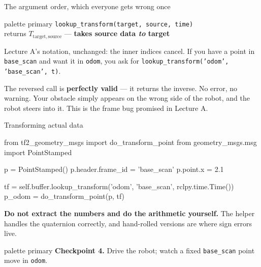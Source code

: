 \documentclass[aspectratio=169]{beamer}
\begin{document}
\begin{frame}{The argument order, which everyone gets wrong once}
  \begin{beamercolorbox}[sep=8pt,center,rounded=true]{palette primary}
    \small \texttt{lookup\_transform(target, source, time)}\\[0.3em]
    returns $T_{\text{target},\,\text{source}}$ --- \textbf{takes source data \emph{to} target}
  \end{beamercolorbox}

  \vspace{0.8em}
  \small
  Lecture A's notation, unchanged: the inner indices cancel. If you have a point in
  \texttt{base\_scan} and want it in \texttt{odom}, you ask for
  \texttt{lookup\_transform('odom', 'base\_scan', t)}.

  \vspace{0.8em}
  \begin{underhood}
    \footnotesize
    The reversed call is \textbf{perfectly valid} --- it returns the inverse. No error, no
    warning. Your obstacle simply appears on the wrong side of the robot, and the robot
    steers into it. This is the frame bug promised in Lecture A.
  \end{underhood}
\end{frame}

\begin{frame}[fragile]{Transforming actual data}
  \begin{pycodes}
from tf2_geometry_msgs import do_transform_point
from geometry_msgs.msg import PointStamped

p = PointStamped()
p.header.frame_id = 'base_scan'
p.point.x = 2.1

tf = self.buffer.lookup_transform('odom', 'base_scan', rclpy.time.Time())
p_odom = do_transform_point(p, tf)
  \end{pycodes}

  \vspace{0.4em}
  \small
  \textbf{Do not extract the numbers and do the arithmetic yourself.} The helper handles the
  quaternion correctly, and hand-rolled versions are where sign errors live.

  \vspace{0.3em}
  \centering
  \begin{beamercolorbox}[sep=5pt,center,rounded=true]{palette primary}
    \footnotesize \textbf{Checkpoint 4.} Drive the robot; watch a fixed \texttt{base\_scan}
    point move in \texttt{odom}.
  \end{beamercolorbox}
\end{frame}
\end{document}
